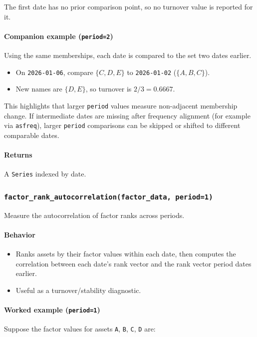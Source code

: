 \documentclass[11pt]{article}
\begin{document}
The first date has no prior comparison point, so no turnover value is reported for it.

\paragraph{Companion example (\texttt{period=2})}
Using the same memberships, each date is compared to the set two dates earlier.

\begin{itemize}
  \item On \texttt{2026-01-06}, compare \(\{C, D, E\}\) to \texttt{2026-01-02} (\(\{A, B, C\}\)).
  \item New names are \(\{D, E\}\), so turnover is \(2 / 3 = 0.6667\).
\end{itemize}

This highlights that larger \texttt{period} values measure non-adjacent membership change.
If intermediate dates are missing after frequency alignment (for example via \texttt{asfreq}), larger \texttt{period} comparisons can be skipped or shifted to different comparable dates.

\paragraph{Returns}
A \texttt{Series} indexed by date.

\subsubsection{\texttt{factor\_rank\_autocorrelation(factor\_data, period=1)}}
Measure the autocorrelation of factor ranks across periods.

\paragraph{Behavior}
\begin{itemize}
  \item Ranks assets by their factor values within each date, then computes the correlation between each date's rank vector and the rank vector period dates earlier.
  \item Useful as a turnover/stability diagnostic.
\end{itemize}

\paragraph{Worked example (\texttt{period=1})}
Suppose the factor values for assets \texttt{A}, \texttt{B}, \texttt{C}, \texttt{D} are:
\end{document}

